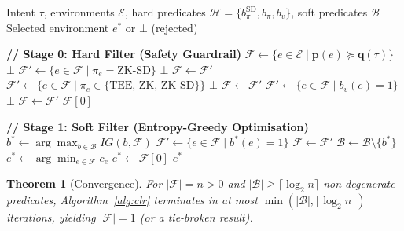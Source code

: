 \documentclass[conference, 10pt, twocolumn]{IEEEtran}
\newtheorem{theorem}{Theorem}
\begin{document}
\begin{algorithm}[t]
\caption{CLR Chain Selection (Two-Stage Guardrail, v2)}
\label{alg:clr}
\begin{algorithmic}[1]
\REQUIRE Intent $\tau$, environments $\mathcal{E}$,
  hard predicates $\mathcal{H} = \{b_\pi^\text{SD}, b_\pi, b_v\}$,
  soft predicates $\mathcal{B}$
\ENSURE Selected environment $e^*$ or $\bot$ (rejected)

\STATE \textbf{// Stage 0: Hard Filter (Safety Guardrail)}
\STATE $\mathcal{F} \leftarrow \{ e \in \mathcal{E} \mid
  \mathbf{p}(e) \succeq \mathbf{q}(\tau) \}$
  \RETURN $\bot$ 
\ENDIF
{}
  \STATE $\mathcal{F}' \leftarrow \{e \in \mathcal{F} \mid \pi_e = \text{ZK-SD}\}$
    \RETURN $\bot$ 
  \ENDIF
  \STATE $\mathcal{F} \leftarrow \mathcal{F}'$
  \STATE $\mathcal{F}' \leftarrow \{e \in \mathcal{F} \mid \pi_e \in \{\text{TEE, ZK, ZK-SD}\}\}$
    \RETURN $\bot$ 
  \ENDIF
  \STATE $\mathcal{F} \leftarrow \mathcal{F}'$
\ENDIF
{}
  \STATE $\mathcal{F}' \leftarrow \{e \in \mathcal{F} \mid b_v(e)=1\}$
    \RETURN $\bot$ 
  \ENDIF
  \STATE $\mathcal{F} \leftarrow \mathcal{F}'$
\ENDIF
{}
  \RETURN $\mathcal{F}[0]$ 
\ENDIF

\STATE \textbf{// Stage 1: Soft Filter (Entropy-Greedy Optimisation)}
  \STATE $b^* \leftarrow \arg\max_{b \in \mathcal{B}} IG(b, \mathcal{F})$
  \STATE $\mathcal{F}' \leftarrow \{e \in \mathcal{F} \mid b^*(e) = 1\}$
    \STATE $\mathcal{F} \leftarrow \mathcal{F}'$
  \ENDIF
  \STATE $\mathcal{B} \leftarrow \mathcal{B} \setminus \{b^*\}$
\ENDWHILE
{}
  \STATE $e^* \leftarrow \arg\min_{e \in \mathcal{F}} c_e$
\ELSE
  \STATE $e^* \leftarrow \mathcal{F}[0]$
\ENDIF
\RETURN $e^*$
\end{algorithmic}
\end{algorithm}

\begin{theorem}[Convergence]
\label{thm:convergence}
For $|\mathcal{F}| = n > 0$ and $|\mathcal{B}| \geq \lceil \log_2
n \rceil$ non-degenerate predicates, Algorithm~\ref{alg:clr}
terminates in at most $\min(|\mathcal{B}|, \lceil \log_2 n \rceil)$
iterations, yielding $|\mathcal{F}| = 1$ (or a tie-broken result).
\end{theorem}
\end{document}
